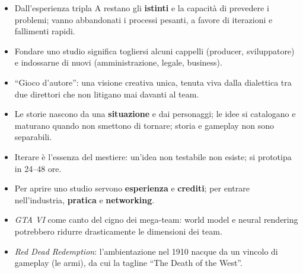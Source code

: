 \begin{itemize}
  \item Dall'esperienza tripla A restano gli \textbf{istinti} e la capacità di
        prevedere i problemi; vanno abbandonati i processi pesanti, a favore di
        iterazioni e fallimenti rapidi.
  \item Fondare uno studio significa togliersi alcuni cappelli (producer,
        sviluppatore) e indossarne di nuovi (amministrazione, legale, business).
  \item ``Gioco d'autore'': una visione creativa unica, tenuta viva dalla
        dialettica tra due direttori che non litigano mai davanti al team.
  \item Le storie nascono da una \textbf{situazione} e dai personaggi; le idee si
        catalogano e maturano quando non smettono di tornare; storia e gameplay non
        sono separabili.
  \item Iterare è l'essenza del mestiere: un'idea non testabile non esiste; si
        prototipa in 24--48 ore.
  \item Per aprire uno studio servono \textbf{esperienza} e \textbf{crediti}; per
        entrare nell'industria, \textbf{pratica} e \textbf{networking}.
  \item \emph{GTA VI} come canto del cigno dei mega-team: world model e neural
        rendering potrebbero ridurre drasticamente le dimensioni dei team.
  \item \emph{Red Dead Redemption}: l'ambientazione nel 1910 nacque da un vincolo di
        gameplay (le armi), da cui la tagline ``The Death of the West''.
\end{itemize}
